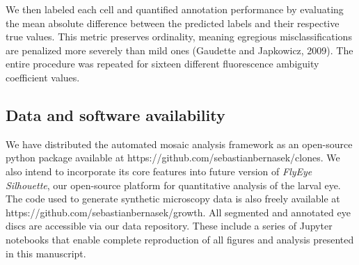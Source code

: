 We then labeled each cell and quantified annotation performance by evaluating the mean absolute difference between the predicted labels and their respective true values. This metric preserves ordinality, meaning egregious misclassifications are penalized more severely than mild ones (Gaudette and Japkowicz, 2009). The entire procedure was repeated for sixteen different fluorescence ambiguity coefficient values.

\subsection{Data and software availability}

We have distributed the automated mosaic analysis framework as an open-source python package available at https://github.com/sebastianbernasek/clones. We also intend to incorporate its core features into future version of \emph{FlyEye Silhouette}, our open-source platform for quantitative analysis of the larval eye. The code used to generate synthetic microscopy data is also freely available at https://github.com/sebastianbernasek/growth. All segmented and annotated eye discs are accessible via our data repository. These include a series of Jupyter notebooks that enable complete reproduction of all figures and analysis presented in this manuscript.




